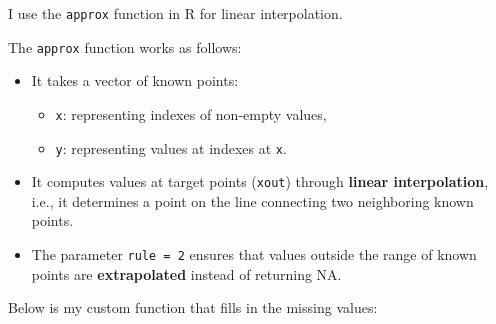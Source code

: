 \documentclass[
]{article}
\newenvironment{Shaded}{\begin{snugshade}}{\end{snugshade}}
\newcommand{\AttributeTok}[1]{\textcolor[rgb]{0.13,0.29,0.53}{#1}}
\newcommand{\ControlFlowTok}[1]{\textcolor[rgb]{0.13,0.29,0.53}{\textbf{#1}}}
\newcommand{\DecValTok}[1]{\textcolor[rgb]{0.00,0.00,0.81}{#1}}
\newcommand{\FunctionTok}[1]{\textcolor[rgb]{0.13,0.29,0.53}{\textbf{#1}}}
\newcommand{\NormalTok}[1]{#1}
\newcommand{\OtherTok}[1]{\textcolor[rgb]{0.56,0.35,0.01}{#1}}
\newcommand{\SpecialCharTok}[1]{\textcolor[rgb]{0.81,0.36,0.00}{\textbf{#1}}}
\providecommand{\tightlist}{%
  \setlength{\itemsep}{0pt}\setlength{\parskip}{0pt}}
\begin{document}
I use the \texttt{approx} function in R for linear interpolation.

The \texttt{approx} function works as follows:

\begin{itemize}
\item
  It takes a vector of known points:

  \begin{itemize}
  \tightlist
  \item
    \texttt{x}: representing indexes of non-empty values,
  \item
    \texttt{y}: representing values at indexes at \texttt{x}.
  \end{itemize}
\item
  It computes values at target points (\texttt{xout}) through
  \textbf{linear interpolation}, i.e., it determines a point on the line
  connecting two neighboring known points.
\item
  The parameter \texttt{rule\ =\ 2} ensures that values outside the
  range of known points are \textbf{extrapolated} instead of returning
  NA.
\end{itemize}

Below is my custom function that fills in the missing values:

\begin{Shaded}
\end{Shaded}
\end{document}
